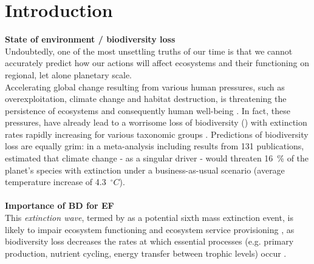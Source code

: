 \chapter{Introduction}
\label{chap:intro}
\textbf{State of environment / biodiversity loss}\\
Undoubtedly, one of the most unsettling truths of our time is that we cannot accurately predict how our actions will affect ecosystems and their functioning on regional, let alone planetary scale.\\
Accelerating global change resulting from various human pressures, such as overexploitation, climate change and habitat destruction, is threatening the persistence of ecosystems and consequently human well-being \citep{MEA2005, Hooper2012}. In fact, these pressures, have already lead to a worrisome loss of biodiversity ()
with extinction rates rapidly increasing for various taxonomic groups \citep{Dirzo2003,Wake2008}.
Predictions of biodiversity loss are equally grim: in a meta-analysis including results from 131 publications, \cite{Urban2015} estimated that climate change - as a singular driver - would threaten 16~\% of the planet's species with extinction under a business-as-usual scenario (average temperature increase of 4.3~$^{\circ}C$). 
\\\\
%
\textbf{Importance of BD for EF}\\
 This \emph{extinction wave}, termed by \cite{Barnosky2011} as a potential sixth mass extinction event, is likely to impair ecosystem functioning and ecosystem service provisioning \citep{MEA2005,Naeem2012}, as
biodiversity loss decreases the rates at which essential processes (e.g. primary production, nutrient cycling, energy transfer between trophic levels) occur \citep[][]{Cardinale2012, Hooper2012}. \\
